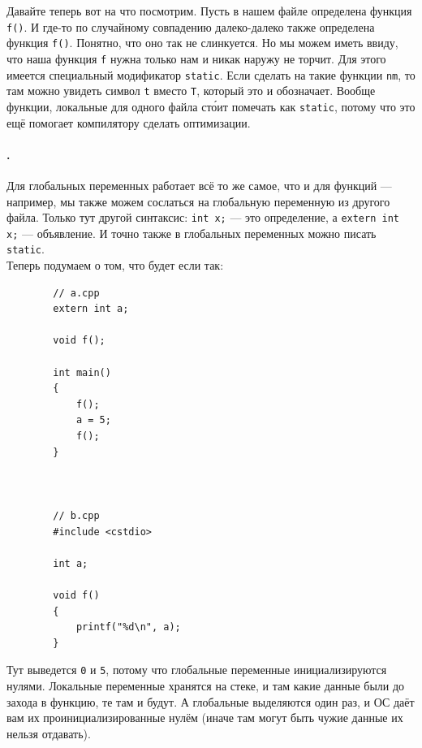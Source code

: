 \documentclass{article}
\begin{document}
    Давайте теперь вот на что посмотрим. Пусть в нашем файле определена функция \texttt{f()}. И где-то по случайному совпадению далеко-далеко также определена функция \texttt{f()}. Понятно, что оно так не слинкуется. Но мы можем иметь ввиду, что наша функция \texttt{f} нужна только нам и никак наружу не торчит. Для этого имеется специальный модификатор \texttt{static}. Если сделать на такие функции \texttt{nm}, то там можно увидеть символ \texttt{t} вместо \texttt{T}, который это и обозначает. Вообще функции, локальные для одного файла ст\'{о}ит помечать как \texttt{static}, потому что это ещё помогает компилятору сделать оптимизации.
    \paragraph{.}
    Для глобальных переменных работает всё то же самое, что и для функций --- например, мы также можем сослаться на глобальную переменную из другого файла. Только тут другой синтаксис: \texttt{int x;} --- это определение, а \texttt{extern int x;} --- объявление. И точно также в глобальных переменных можно писать \texttt{static}.\\
    Теперь подумаем о том, что будет если так:
    \begin{verbatim}
        // a.cpp
        extern int a;

        void f();

        int main()
        {
            f();
            a = 5;
            f();
        }



        // b.cpp
        #include <cstdio>

        int a;

        void f()
        {
            printf("%d\n", a);
        }
    \end{verbatim}
    Тут выведется \texttt{0} и \texttt{5}, потому что глобальные переменные инициализируются нулями. Локальные переменные хранятся на стеке, и там какие данные были до захода в функцию, те там и будут. А глобальные выделяются один раз, и ОС даёт вам их проинициализированные нулём (иначе там могут быть чужие данные их нельзя отдавать).
\end{document}

